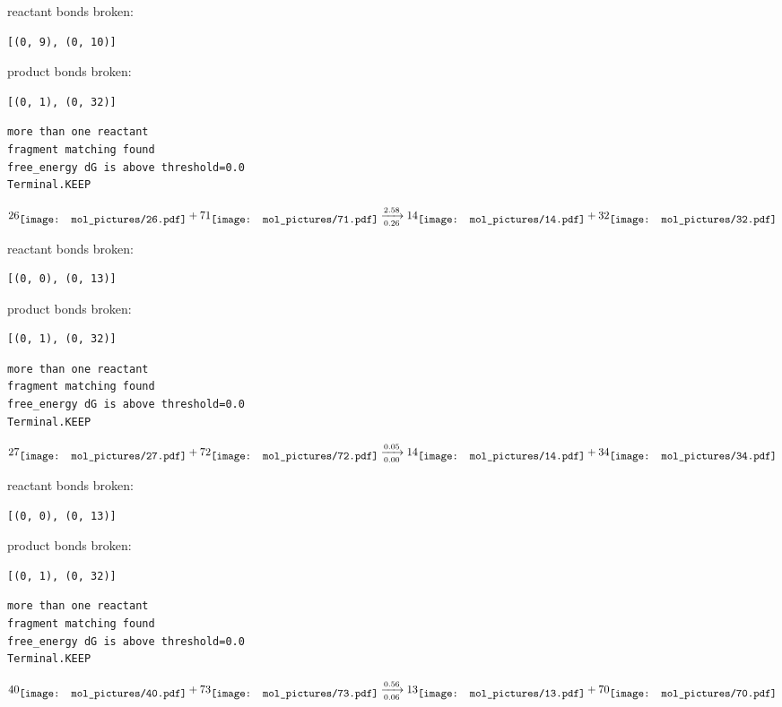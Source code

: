 \documentclass{article}
\begin{document}
reactant bonds broken:\begin{verbatim}
[(0, 9), (0, 10)]
\end{verbatim}
product bonds broken:\begin{verbatim}
[(0, 1), (0, 32)]
\end{verbatim}




\vspace{1cm}
\begin{verbatim}
more than one reactant
fragment matching found
free_energy dG is above threshold=0.0
Terminal.KEEP
\end{verbatim}
$$
26
\raisebox{-.5\height}{\texttt{[image: mol\_pictures/26.pdf]}}
+
71
\raisebox{-.5\height}{\texttt{[image: mol\_pictures/71.pdf]}}
\xrightarrow[0.26]{2.58}
14
\raisebox{-.5\height}{\texttt{[image: mol\_pictures/14.pdf]}}
+
32
\raisebox{-.5\height}{\texttt{[image: mol\_pictures/32.pdf]}}
$$


reactant bonds broken:\begin{verbatim}
[(0, 0), (0, 13)]
\end{verbatim}
product bonds broken:\begin{verbatim}
[(0, 1), (0, 32)]
\end{verbatim}




\vspace{1cm}
\begin{verbatim}
more than one reactant
fragment matching found
free_energy dG is above threshold=0.0
Terminal.KEEP
\end{verbatim}
$$
27
\raisebox{-.5\height}{\texttt{[image: mol\_pictures/27.pdf]}}
+
72
\raisebox{-.5\height}{\texttt{[image: mol\_pictures/72.pdf]}}
\xrightarrow[0.00]{0.05}
14
\raisebox{-.5\height}{\texttt{[image: mol\_pictures/14.pdf]}}
+
34
\raisebox{-.5\height}{\texttt{[image: mol\_pictures/34.pdf]}}
$$


reactant bonds broken:\begin{verbatim}
[(0, 0), (0, 13)]
\end{verbatim}
product bonds broken:\begin{verbatim}
[(0, 1), (0, 32)]
\end{verbatim}




\vspace{1cm}
\begin{verbatim}
more than one reactant
fragment matching found
free_energy dG is above threshold=0.0
Terminal.KEEP
\end{verbatim}
$$
40
\raisebox{-.5\height}{\texttt{[image: mol\_pictures/40.pdf]}}
+
73
\raisebox{-.5\height}{\texttt{[image: mol\_pictures/73.pdf]}}
\xrightarrow[0.06]{0.56}
13
\raisebox{-.5\height}{\texttt{[image: mol\_pictures/13.pdf]}}
+
70
\raisebox{-.5\height}{\texttt{[image: mol\_pictures/70.pdf]}}
$$
\end{document}
